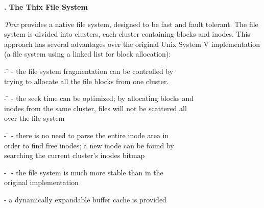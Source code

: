 \begin{slide}{}


{\small \bf {}. The Thix File System\\
}

\vspace{2cm}

{\tiny {\em Thix} provides a native file system, designed to be fast
and fault tolerant.  The file system is divided into clusters, each
cluster containing blocks and inodes.  This approach has several
advantages over the original Unix System V implementation (a file
system using a linked list for block allocation):

\vspace{1cm}


\begin{tabbing}
\hspace{1cm} - \= \kill
\hspace{1cm} - the file system fragmentation can be controlled by\\
\> trying to allocate all the file blocks from one cluster.
\end{tabbing}

\begin{tabbing}
\hspace{1cm} - \= \kill
\hspace{1cm} - the seek time can be optimized; by allocating blocks and\\
\> inodes from the same cluster, files will not be scattered all\\
\> over the file system
\end{tabbing}

\begin{tabbing}
\hspace{1cm} - \= \kill
\hspace{1cm} - there is no need to parse the entire inode area in\\
\> order to find free inodes; a new inode can be found by\\
\> searching the current cluster's inodes bitmap
\end{tabbing}

\begin{tabbing}
\hspace{1cm} - \= \kill
\hspace{1cm} - the file system is much more stable than in the\\
\> original implementation
\end{tabbing}

\hspace{1cm} - a dynamically expandable buffer cache is provided

}
\end{slide}
